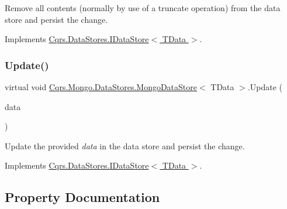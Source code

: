 Remove all contents (normally by use of a truncate operation) from the data store and persist the change. 



Implements \hyperlink{interfaceCqrs_1_1DataStores_1_1IDataStore_aead8d7a39a717d29af05daf7b64bea94}{Cqrs.\+Data\+Stores.\+I\+Data\+Store$<$ T\+Data $>$}.

\mbox{\label{classCqrs_1_1Mongo_1_1DataStores_1_1MongoDataStore_a03aac0495445d34f124db893cd09cbd8}} 
\subsubsection{\texorpdfstring{Update()}{Update()}}
{\footnotesize\ttfamily virtual void \hyperlink{classCqrs_1_1Mongo_1_1DataStores_1_1MongoDataStore}{Cqrs.\+Mongo.\+Data\+Stores.\+Mongo\+Data\+Store}$<$ T\+Data $>$.Update (\begin{DoxyParamCaption}\item[{T\+Data}]{data }\end{DoxyParamCaption})\hspace{0.3cm}{\ttfamily [virtual]}}



Update the provided {\itshape data}  in the data store and persist the change. 



Implements \hyperlink{interfaceCqrs_1_1DataStores_1_1IDataStore_a6d5d4dd572de8db01ff0c48d37faefa7}{Cqrs.\+Data\+Stores.\+I\+Data\+Store$<$ T\+Data $>$}.



\subsection{Property Documentation}
\mbox{\label{classCqrs_1_1Mongo_1_1DataStores_1_1MongoDataStore_a0b55d9ca4d8ac206dd7beec30aa123df}} 
